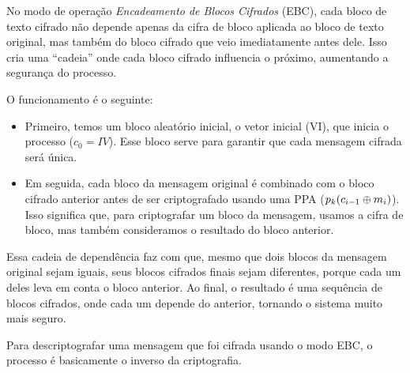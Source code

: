 No modo de operação {\em Encadeamento de Blocos Cifrados} (EBC), cada bloco de texto cifrado não depende apenas da cifra de bloco aplicada ao bloco de texto original, mas também do bloco cifrado que veio imediatamente antes dele.
Isso cria uma ``cadeia'' onde cada bloco cifrado influencia o próximo, aumentando a segurança do processo.

O funcionamento é o seguinte:

\begin{itemize}
\item Primeiro, temos um bloco aleatório inicial, o vetor inicial (VI), que inicia o processo ($c_0 = IV$).
  Esse bloco serve para garantir que cada mensagem cifrada será única.
\item Em seguida, cada bloco da mensagem original é combinado com o bloco cifrado anterior antes de ser criptografado usando uma PPA ($p_k(c_{i-1} \oplus m_i)$).
  Isso significa que, para criptografar um bloco da mensagem, usamos a cifra de bloco, mas também consideramos o resultado do bloco anterior.
\end{itemize}

Essa cadeia de dependência faz com que, mesmo que dois blocos da mensagem original sejam iguais, seus blocos cifrados finais sejam diferentes, porque cada um deles leva em conta o bloco anterior.
Ao final, o resultado é uma sequência de blocos cifrados, onde cada um depende do anterior, tornando o sistema muito mais seguro.

\begin{center}
\end{center}

Para descriptografar uma mensagem que foi cifrada usando o modo EBC, o processo é basicamente o inverso da criptografia.

